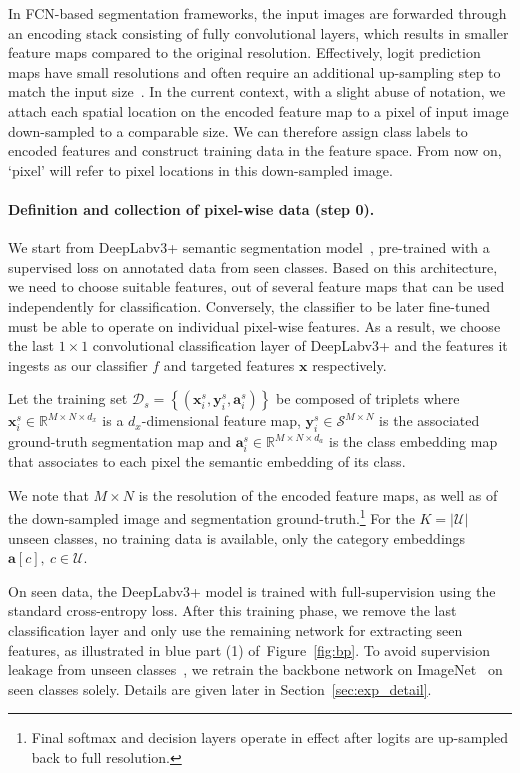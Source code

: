 \documentclass{article}
\newcommand{\mbf}[1]{\ensuremath{\mathbf{#1}}}
\newcommand{\mc}[1]{\ensuremath{\mathcal{#1}}}
\newcommand{\bx}{\mbf{x}}
\newcommand{\by}{\mbf{y}}
\newcommand{\ba}{\mbf{a}}
\newcommand{\cS}{\mc{S}}
\newcommand{\cU}{\mc{U}}
\newcommand{\cD}{\mc{D}}
\begin{document}
In FCN-based segmentation frameworks, the input images are forwarded through an encoding stack consisting of fully convolutional layers, which results in smaller feature maps compared to the original resolution.
Effectively, logit prediction maps have small resolutions and often require an additional up-sampling step to match the input size~\cite{chen2017deeplab, chen2018encoder, long2015fully}.
In the current context, with a slight abuse of notation, we attach each spatial location on the encoded feature map to a pixel of input image down-sampled to a comparable size. We can therefore assign class labels to encoded features and construct training data in the feature space.
From now on, `pixel' will refer to pixel locations in this down-sampled image.

\vspace{-0.3cm}
\paragraph{Definition and collection of pixel-wise data (step 0).}
We start from DeepLabv3+ semantic segmentation model~\cite{chen2018encoder}, pre-trained with a supervised loss on annotated data from seen classes. 
Based on this architecture, we need to choose suitable features, out of several feature maps that can be used independently for classification.
Conversely, the classifier to be later fine-tuned must be able to operate on individual pixel-wise features.
As a result, we choose the last $1\times1$ convolutional classification layer of DeepLabv3+ and the features it ingests as our classifier $f$ and targeted features $\bx$ respectively.

Let the training set $\cD_s = \left\{(\bx^s_i, \by^s_i, \ba^s_i) \right\}$ be composed of triplets where $\bx^s_i\in \mathbb{R}^{M\times N \times d_x}$ is 
a $d_x$-dimensional feature map, 
$\by^s_i \in \cS^{M\times N}$ is the associated ground-truth
segmentation map and $\ba^s_i \in \mathbb{R}^{M\times N \times d_a}$ is the class embedding map that associates to each pixel the semantic embedding of its class.

We note that $M\times N$ is the resolution of the encoded feature maps, as well as of the down-sampled image and segmentation ground-truth.\footnote{Final softmax and decision layers operate in effect after logits are up-sampled back to full resolution.}
For the $K = |\cU|$ unseen classes, no training data is available, only the category embeddings $\ba[c],~c\in\cU$.

On seen data, the DeepLabv3+ model is trained with full-supervision using the standard cross-entropy loss.
After this training phase, we remove the last classification layer and only use the remaining network for extracting seen features, as illustrated in blue part (1) of~Figure~\ref{fig:bp}.
To avoid supervision leakage from unseen classes~\cite{xian2018zero}, we retrain the backbone network on ImageNet~\cite{russakovsky2015imagenet} on seen classes solely.
Details are given later in Section~\ref{sec:exp_detail}.
\end{document}
